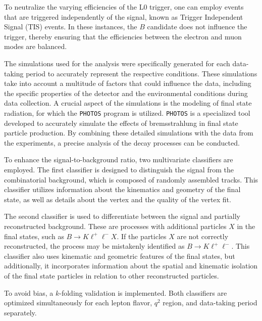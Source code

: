 To neutralize the varying efficiencies of the L0 trigger, one can employ events that are 
triggered independently of the signal, known as Trigger Independent Signal (TIS) events. 
In these instances, the $B$ candidate does not influence the trigger, thereby ensuring that 
the efficiencies between the electron and muon modes are balanced.

The simulations used for the analysis were specifically generated for each data-taking period 
to accurately represent the respective conditions. These simulations take into account a multitude 
of factors that could influence the data, including the specific properties of the detector and 
the environmental conditions during data collection. A crucial aspect of the simulations is the 
modeling of final state radiation, for which the \texttt{PHOTOS} \cite{PHOTOS} program is utilized. 
\texttt{PHOTOS} is a specialized tool developed to accurately simulate the effects of bremsstrahlung in 
final state particle production. By combining these detailed simulations with the data from the 
experiments, a precise analysis of the decay processes can be conducted.

To enhance the signal-to-background ratio, two multivariate classifiers are employed. The 
first classifier is designed to distinguish the signal from the combinatorial background, 
which is composed of randomly assembled tracks. This classifier utilizes information about 
the kinematics and geometry of the final state, as well as details about the vertex and the 
quality of the vertex fit.

The second classifier is used to differentiate between the signal and partially reconstructed 
background. These are processes with additional particles $X$ in the final states, such as 
$B\to K \ell^+\ell^- X$. If the particles $X$ are not correctly reconstructed, the process may be mistakenly 
identified as $B \to K \ell^+\ell^-$. This classifier also uses kinematic and geometric features of 
the final states, but additionally, it incorporates information about the spatial and kinematic 
isolation of the final state particles in relation to other reconstructed particles.

To avoid bias, a $k$-folding validation is implemented. Both classifiers are optimized 
simultaneously for each lepton flavor, $q^2$ region, and data-taking period separately.

